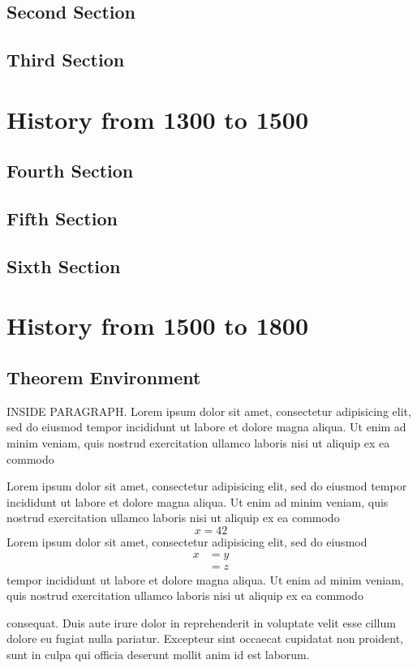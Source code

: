 \section{Second Section}
\lipsum[1-4]

\section{Third Section}
\lipsum[1-5]

\chapter{History from 1300 to 1500}

\section{Fourth Section }
\lipsum[1-6]

\section{Fifth Section }
\lipsum[1-7]

\section{Sixth Section }
\lipsum[1-8]

\chapter{History from 1500 to 1800}

\section{Theorem Environment}

INSIDE PARAGRAPH.
Lorem ipsum dolor sit amet, consectetur adipisicing elit, sed do eiusmod 
tempor incididunt ut labore et dolore magna aliqua. Ut enim ad minim veniam, 
quis nostrud exercitation ullamco laboris nisi ut aliquip ex ea commodo 
\begin{thm}
Lorem ipsum dolor sit amet, consectetur adipisicing elit, sed do eiusmod 
tempor incididunt ut labore et dolore magna aliqua. Ut enim ad minim veniam, 
quis nostrud exercitation ullamco laboris nisi ut aliquip ex ea commodo 
\[
x = 42
\]
Lorem ipsum dolor sit amet, consectetur adipisicing elit, sed do eiusmod 
\begin{align*}
x &= y \\
  &= z
\end{align*}
tempor incididunt ut labore et dolore magna aliqua. Ut enim ad minim veniam, 
quis nostrud exercitation ullamco laboris nisi ut aliquip ex ea commodo 
\end{thm}
\noindent 
consequat. Duis aute irure dolor in reprehenderit in voluptate velit esse 
cillum dolore eu fugiat nulla pariatur. Excepteur sint occaecat cupidatat non 
proident, sunt in culpa qui officia deserunt mollit anim id est laborum.

